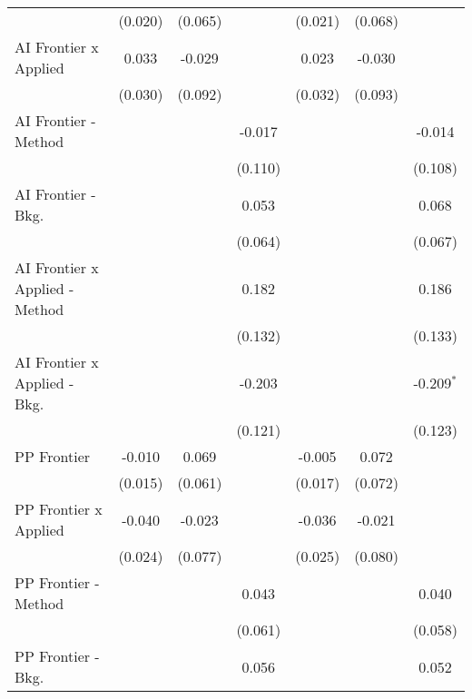 \begin{tabular}{lcccccc}
                                  & (0.020)       & (0.065) &              & (0.021) & (0.068) &   \\   
   AI Frontier x Applied          & 0.033         & -0.029  &              & 0.023   & -0.030  &   \\   
                                  & (0.030)       & (0.092) &              & (0.032) & (0.093) &   \\   
   AI Frontier - Method           &               &         & -0.017       &         &         & -0.014\\   
                                  &               &         & (0.110)      &         &         & (0.108)\\   
   AI Frontier - Bkg.             &               &         & 0.053        &         &         & 0.068\\   
                                  &               &         & (0.064)      &         &         & (0.067)\\   
   AI Frontier x Applied - Method &               &         & 0.182        &         &         & 0.186\\   
                                  &               &         & (0.132)      &         &         & (0.133)\\   
   AI Frontier x Applied - Bkg.   &               &         & -0.203       &         &         & -0.209$^{*}$\\   
                                  &               &         & (0.121)      &         &         & (0.123)\\   
   PP Frontier                    & -0.010        & 0.069   &              & -0.005  & 0.072   &   \\   
                                  & (0.015)       & (0.061) &              & (0.017) & (0.072) &   \\   
   PP Frontier x Applied          & -0.040        & -0.023  &              & -0.036  & -0.021  &   \\   
                                  & (0.024)       & (0.077) &              & (0.025) & (0.080) &   \\   
   PP Frontier - Method           &               &         & 0.043        &         &         & 0.040\\   
                                  &               &         & (0.061)      &         &         & (0.058)\\   
   PP Frontier - Bkg.             &               &         & 0.056        &         &         & 0.052\\   

\end{tabular}
